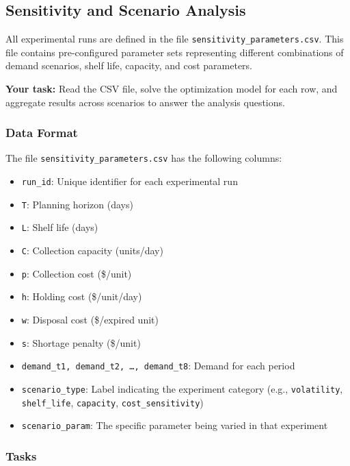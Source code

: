 \documentclass{KPS_assignment}
\begin{document}
\subsection*{Sensitivity and Scenario Analysis}

All experimental runs are defined in the file \texttt{sensitivity\_parameters.csv}. This file contains pre-configured parameter sets representing different combinations of demand scenarios, shelf life, capacity, and cost parameters. 

\textbf{Your task:} Read the CSV file, solve the optimization model for each row, and aggregate results across scenarios to answer the analysis questions.

\subsubsection*{Data Format}

The file \texttt{sensitivity\_parameters.csv} has the following columns:
\begin{itemize}
    \item \texttt{run\_id}: Unique identifier for each experimental run
    \item \texttt{T}: Planning horizon (days)
    \item \texttt{L}: Shelf life (days)
    \item \texttt{C}: Collection capacity (units/day)
    \item \texttt{p}: Collection cost (\$/unit)
    \item \texttt{h}: Holding cost (\$/unit/day)
    \item \texttt{w}: Disposal cost (\$/expired unit)
    \item \texttt{s}: Shortage penalty (\$/unit)
    \item \texttt{demand\_t1, demand\_t2, \ldots, demand\_t8}: Demand for each period
    \item \texttt{scenario\_type}: Label indicating the experiment category (e.g., \texttt{volatility}, \texttt{shelf\_life}, \texttt{capacity}, \texttt{cost\_sensitivity})
    \item \texttt{scenario\_param}: The specific parameter being varied in that experiment
\end{itemize}

\subsubsection*{Tasks}
\end{document}
